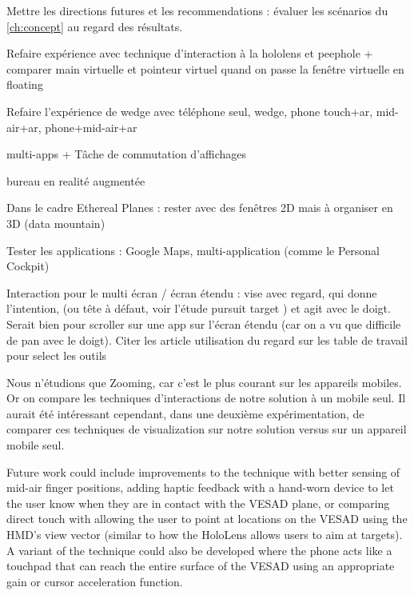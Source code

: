 Mettre les directions futures et les recommendations : évaluer les scénarios du \autoref{ch:concept} au regard des résultats.

Refaire expérience avec technique d'interaction à la hololens et peephole + comparer main virtuelle et pointeur virtuel quand on passe la fenêtre virtuelle en floating

Refaire l'expérience de wedge avec téléphone seul, wedge, phone touch+ar, mid-air+ar, phone+mid-air+ar

multi-apps + Tâche de commutation d'affichages

bureau en realité augmentée

Dans le cadre Ethereal Planes : rester avec des fenêtres 2D mais à organiser en 3D (data mountain)

Tester les applications : Google Maps, multi-application (comme le Personal Cockpit)

Interaction pour le multi écran / écran étendu : vise avec regard, qui donne l'intention, (ou tête à défaut, voir l'étude pursuit target \citep{Esteves2017}) et agit avec le doigt. Serait bien pour scroller sur une app sur l'écran étendu (car on a vu que difficile de pan avec le doigt). Citer les article utilisation du regard sur les table de travail pour select les outils

Nous n'étudions que Zooming, car c'est le plus courant sur les appareils mobiles. Or on compare les techniques d'interactions de notre solution à un mobile seul. Il aurait été intéressant cependant, dans une deuxième expérimentation, de comparer ces techniques de visualization sur notre solution versus sur un appareil mobile seul.

Future work could include improvements to the  technique with better sensing of mid-air finger positions, adding haptic feedback
with a hand-worn device to let the user know when they are in contact with the VESAD plane, or comparing direct touch with allowing the user to point at locations on the VESAD using the HMD's view vector (similar to how the HoloLens allows users to aim at targets). A variant of the  technique could also be developed where the phone acts like a touchpad that can reach the entire surface of the VESAD using an appropriate gain or cursor acceleration function.



